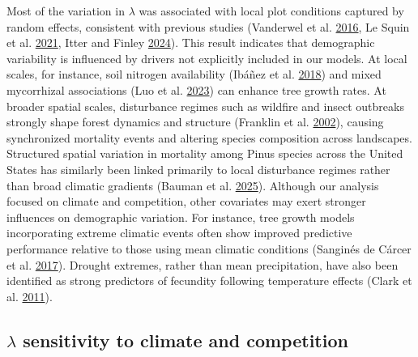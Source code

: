 \documentclass[12pt]{article}
\begin{document}
Most of the variation in \(\lambda\) was associated with local plot
conditions captured by random effects, consistent with previous studies
(Vanderwel et al. \protect\hyperlink{ref-Vanderwel2016a}{2016}, Le Squin
et al. \protect\hyperlink{ref-LeSquin2021}{2021}, Itter and Finley
\protect\hyperlink{ref-itter2024making}{2024}). This result indicates
that demographic variability is influenced by drivers not explicitly
included in our models. At local scales, for instance, soil nitrogen
availability (Ibáñez et al. \protect\hyperlink{ref-Ibanez2018}{2018})
and mixed mycorrhizal associations (Luo et al.
\protect\hyperlink{ref-Luo2023}{2023}) can enhance tree growth rates. At
broader spatial scales, disturbance regimes such as wildfire and insect
outbreaks strongly shape forest dynamics and structure (Franklin et al.
\protect\hyperlink{ref-Franklin2002}{2002}), causing synchronized
mortality events and altering species composition across landscapes.
Structured spatial variation in mortality among Pinus species across the
United States has similarly been linked primarily to local disturbance
regimes rather than broad climatic gradients (Bauman et al.
\protect\hyperlink{ref-bauman2025mosaic}{2025}). Although our analysis
focused on climate and competition, other covariates may exert stronger
influences on demographic variation. For instance, tree growth models
incorporating extreme climatic events often show improved predictive
performance relative to those using mean climatic conditions (Sanginés
de Cárcer et al. \protect\hyperlink{ref-Sangines2017}{2017}). Drought
extremes, rather than mean precipitation, have also been identified as
strong predictors of fecundity following temperature effects (Clark et
al. \protect\hyperlink{ref-Clark2011}{2011}).

\hypertarget{lambda-sensitivity-to-climate-and-competition-1}{%
\subsection{\texorpdfstring{\(\lambda\) sensitivity to climate and
competition}{\textbackslash lambda sensitivity to climate and competition}}\label{lambda-sensitivity-to-climate-and-competition-1}}
\end{document}
